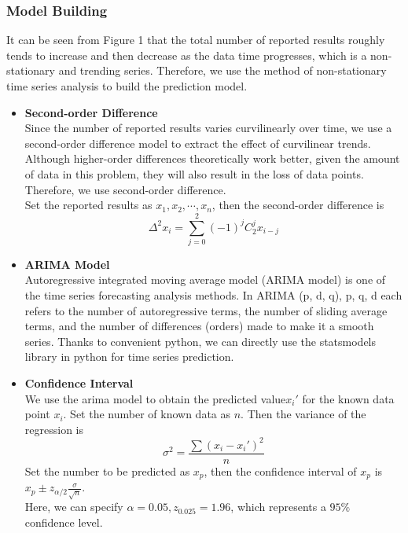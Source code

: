 \documentclass[12pt]{article}
\begin{document}
\subsubsection{Model Building}
It can be seen from Figure 1 that the total number of reported results roughly tends to increase and then decrease as the data time progresses, which is a non-stationary and trending series. Therefore, we use the method of non-stationary time series analysis to build the prediction model.

\begin{itemize}
    \setlength{\parskip}{0.2pt}
	\item \textbf{Second-order Difference}\\
	Since the number of reported results varies curvilinearly over time, we use a second-order difference model to extract the effect of curvilinear trends. Although higher-order differences theoretically work better, given the amount of data in this problem, they will also result in the loss of data points. Therefore, we use second-order difference.\\
    Set the reported results as $x_1,x_2,\cdots,x_n$, then the second-order difference is
    \begin{equation}    
    \Delta^{2} x_{i}=\sum_{j=0}^{2}(-1)^{j} C_{2}^{j} x_{i-j}
    \end{equation}
    
    \item \textbf{ARIMA Model}\\
    Autoregressive integrated moving average model (ARIMA model) is one of the time series forecasting analysis methods.
    In ARIMA (p, d, q), p, q, d each refers to the number of autoregressive terms, the number of sliding average terms, and the number of differences (orders) made to make it a smooth series. 
    Thanks to convenient python, we can directly use the statsmodels library in python for time series prediction.
    
    \item \textbf{Confidence Interval}\\
    We use the arima model to obtain the predicted value$ x_i'$ for the known data point $x_i$.
    Set the number of known data as $n$. Then the variance of the regression is
    \begin{equation}   
    \sigma^{2}=\frac{\sum(x_i-x_i')^{2}}{n}
    \end{equation}
    Set the number to be predicted as $x_p$, then the confidence interval of $x_p$ is
    $x_p \pm {z}_{\alpha / 2} \frac{\sigma}{\sqrt{n}}$.\\
    Here, we can specify $\alpha = 0.05, z_{0.025}=1.96$, which represents a $95\%$ confidence level.

\end{itemize}
\end{document}
